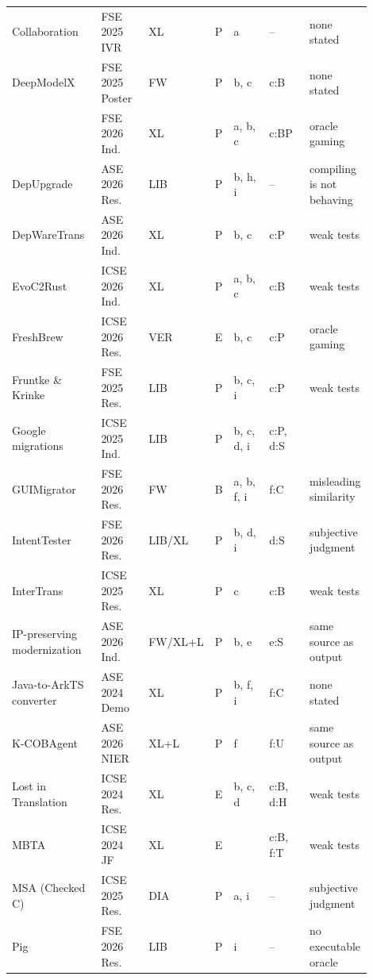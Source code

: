 \begin{table}[p]
\begin{tabular}{@{}P{0.22\linewidth} P{0.14\linewidth} P{0.08\linewidth} P{0.05\linewidth} P{0.12\linewidth} P{0.12\linewidth} P{0.17\linewidth}@{}}
    Collaboration~\cite{collaboration} & FSE 2025 IVR & XL & P & a & -- & none stated \\
    DeepModelX~\cite{deepmodelx} & FSE 2025 Poster & FW & P & b, c & c:B & none stated \\
    ~\cite{dgir} & FSE 2026 Ind. & XL & P & a, b, c & c:BP & oracle gaming \\
    DepUpgrade~\cite{depupgrade} & ASE 2026 Res. & LIB & P & b, h, i & -- & compiling is not behaving \\
    DepWareTrans~\cite{depwaretrans} & ASE 2026 Ind. & XL & P & b, c & c:P & weak tests \\
    EvoC2Rust~\cite{evoc2rust} & ICSE 2026 Ind. & XL & P & a, b, c & c:B & weak tests \\
    FreshBrew~\cite{freshbrew} & ICSE 2026 Res. & VER & E & b, c & c:P & oracle gaming \\
    Fruntke \& Krinke~\cite{fruntke} & FSE 2025 Res. & LIB & P & b, c, i & c:P & weak tests \\
    Google migrations~\cite{googlemig} & ICSE 2025 Ind. & LIB & P & b, c, d, i & c:P, d:S &  \\
    GUIMigrator~\cite{guimigrator} & FSE 2026 Res. & FW & B & a, b, f, i & f:C & misleading similarity \\
    IntentTester~\cite{intenttester} & FSE 2026 Res. & LIB/XL & P & b, d, i & d:S & subjective judgment \\
    InterTrans~\cite{intertrans} & ICSE 2025 Res. & XL & P & c & c:B & weak tests \\
    IP-preserving modernization~\cite{ipmodern} & ASE 2026 Ind. & FW/XL+L & P & b, e & e:S & same source as output \\
    Java-to-ArkTS converter~\cite{arkts} & ASE 2024 Demo & XL & P & b, f, i & f:C & none stated \\
    K-COBAgent~\cite{kcobagent} & ASE 2026 NIER & XL+L & P & f & f:U & same source as output \\
    Lost in Translation~\cite{lostintranslation} & ICSE 2024 Res. & XL & E & b, c, d & c:B, d:H & weak tests \\
    MBTA~\cite{mbta} & ICSE 2024 JF & XL & E &  & c:B, f:T & weak tests \\
    MSA (Checked C)~\cite{msa} & ICSE 2025 Res. & DIA & P & a, i & -- & subjective judgment \\
    Pig~\cite{pig} & FSE 2026 Res. & LIB & P & i & -- & no executable oracle \\

\end{tabular}
\end{table}
